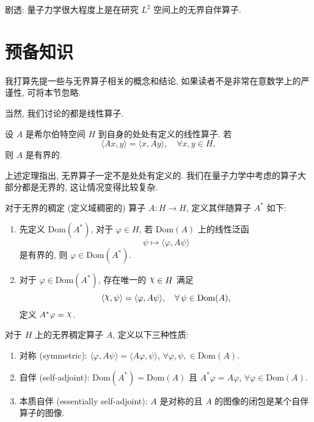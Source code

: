 剧透: 量子力学很大程度上是在研究 $ L^2 $ 空间上的无界自伴算子. 

\setcounter{section}{-1}
\section{预备知识}
我打算先提一些与无界算子相关的概念和结论, 如果读者不是非常在意数学上的严谨性, 可将本节忽略. 

\begin{remark}
    当然, 我们讨论的都是线性算子.
\end{remark}

\begin{theorem}
    \label{Hellinger-Toeplitz}
    设 $ A $ 是希尔伯特空间 $ H $ 到自身的处处有定义的线性算子. 若
    \[ \langle Ax,y \rangle=\langle x,Ay \rangle,\quad\forall x,y\in H,\]
    则 $ A $ 是有界的.
\end{theorem}

上述定理指出, 无界算子一定不是处处有定义的. 我们在量子力学中考虑的算子大部分都是无界的, 这让情况变得比较复杂.

\begin{definition}[伴随算子]
    对于无界的稠定 (定义域稠密的) 算子 $ A:H\to H $, 定义其伴随算子 $ A^* $ 如下:
    \begin{enumerate}
        \item 先定义 $ \mathrm{Dom}(A^*) $, 对于 $ \varphi\in H $, 若 $ \mathrm{Dom}(A) $ 上的线性泛函 
        \[ \psi\mapsto \langle \varphi,A\psi\rangle \] 
        是有界的, 则 $ \varphi\in\mathrm{Dom}(A^*) $.
        \item 对于 $ \varphi\in\mathrm{Dom}(A^*) $, 存在唯一的 $ \rchi \in H$ 满足
        \[ \langle \rchi,\psi \rangle=\langle \varphi,A\psi \rangle,\quad\forall\psi\in\mathrm{Dom}(A), \]
        定义 $ A^*\varphi=\rchi $.
    \end{enumerate}
\end{definition}

\begin{definition}
    对于 $ H $ 上的无界稠定算子 $ A $, 定义以下三种性质:
    \begin{enumerate}
        \item 对称 (symmetric): $ \langle \varphi,A\psi \rangle=\langle A\varphi,\psi \rangle $, $ \forall \varphi,\psi,\in\mathrm{Dom}(A) $.
        \item 自伴 (self-adjoint): $ \mathrm{Dom}(A^*)=\mathrm{Dom}(A) $ 且 $ A^*\varphi=A\varphi $, $ \forall\varphi\in\mathrm{Dom}(A) $.
        \item  本质自伴 (essentially self-adjoint): $ A $ 是对称的且 $ A $ 的图像的闭包是某个自伴算子的图像.
    \end{enumerate}
\end{definition}

